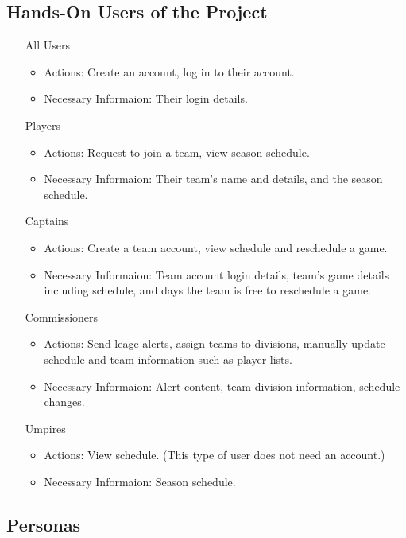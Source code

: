 \documentclass[12pt]{article}
\begin{document}
\subsection{Hands-On Users of the Project}

\begin{itemize}
  \item [All Users]
  \begin{itemize}
    \item Actions: Create an account, log in to their account.
    \item Necessary Informaion: Their login details.
  \end{itemize}
  \item [Players]
  \begin{itemize}
    \item Actions: Request to join a team, view season schedule.
    \item Necessary Informaion: Their team's name and details, and the season
    schedule.
  \end{itemize}
  \item [Captains]
  \begin{itemize}
    \item Actions: Create a team account, view schedule and reschedule a game.
    \item Necessary Informaion: Team account login details, team's game
    details including schedule, and days the team is free to reschedule a
    game.
  \end{itemize}
  \item [Commissioners]
  \begin{itemize}
    \item Actions: Send leage alerts, assign teams to divisions, manually
    update schedule and team information such as player lists.
    \item Necessary Informaion: Alert content, team division information,
    schedule changes.
  \end{itemize}
  \item [Umpires]
  \begin{itemize}
    \item Actions: View schedule. (This type of user does not need an
    account.)
    \item Necessary Informaion: Season schedule.
  \end{itemize}
\end{itemize}

\subsection{Personas}
\end{document}
